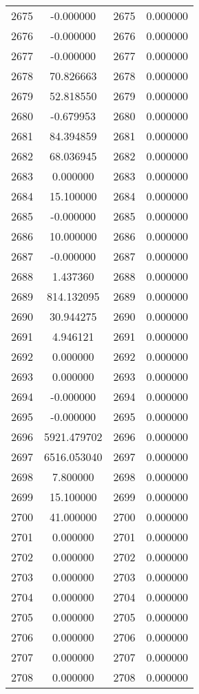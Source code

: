 \documentclass[12pt]{article}
\begin{document}
\begin{longtable}{@{}cccc@{}}
2675 & -0.000000 & 2675 & 0.000000 \\
2676 & -0.000000 & 2676 & 0.000000 \\
2677 & -0.000000 & 2677 & 0.000000 \\
2678 & 70.826663 & 2678 & 0.000000 \\
2679 & 52.818550 & 2679 & 0.000000 \\
2680 & -0.679953 & 2680 & 0.000000 \\
2681 & 84.394859 & 2681 & 0.000000 \\
2682 & 68.036945 & 2682 & 0.000000 \\
2683 & 0.000000 & 2683 & 0.000000 \\
2684 & 15.100000 & 2684 & 0.000000 \\
2685 & -0.000000 & 2685 & 0.000000 \\
2686 & 10.000000 & 2686 & 0.000000 \\
2687 & -0.000000 & 2687 & 0.000000 \\
2688 & 1.437360 & 2688 & 0.000000 \\
2689 & 814.132095 & 2689 & 0.000000 \\
2690 & 30.944275 & 2690 & 0.000000 \\
2691 & 4.946121 & 2691 & 0.000000 \\
2692 & 0.000000 & 2692 & 0.000000 \\
2693 & 0.000000 & 2693 & 0.000000 \\
2694 & -0.000000 & 2694 & 0.000000 \\
2695 & -0.000000 & 2695 & 0.000000 \\
2696 & 5921.479702 & 2696 & 0.000000 \\
2697 & 6516.053040 & 2697 & 0.000000 \\
2698 & 7.800000 & 2698 & 0.000000 \\
2699 & 15.100000 & 2699 & 0.000000 \\
2700 & 41.000000 & 2700 & 0.000000 \\
2701 & 0.000000 & 2701 & 0.000000 \\
2702 & 0.000000 & 2702 & 0.000000 \\
2703 & 0.000000 & 2703 & 0.000000 \\
2704 & 0.000000 & 2704 & 0.000000 \\
2705 & 0.000000 & 2705 & 0.000000 \\
2706 & 0.000000 & 2706 & 0.000000 \\
2707 & 0.000000 & 2707 & 0.000000 \\
2708 & 0.000000 & 2708 & 0.000000 \\

\end{longtable}
\end{document}
